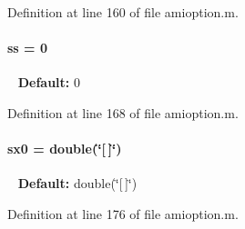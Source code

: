 Definition at line 160 of file amioption.\+m.

\hypertarget{classamioption_a8f60c8102d29fcd525162d02eed4566b}{}
\paragraph[{ss}]{\setlength{\rightskip}{0pt plus 5cm}ss = 0}\label{classamioption_a8f60c8102d29fcd525162d02eed4566b}
~\newline
{\bfseries Default\+:} 0 

Definition at line 168 of file amioption.\+m.

\hypertarget{classamioption_ae40f9a7172d3a41725c151afaec347f7}{}
\paragraph[{sx0}]{\setlength{\rightskip}{0pt plus 5cm}sx0 = double(\char`\"{}\mbox{[}$\,$\mbox{]}\char`\"{})}\label{classamioption_ae40f9a7172d3a41725c151afaec347f7}
~\newline
{\bfseries Default\+:} double(\char`\"{}\mbox{[}$\,$\mbox{]}\char`\"{}) 

Definition at line 176 of file amioption.\+m.


